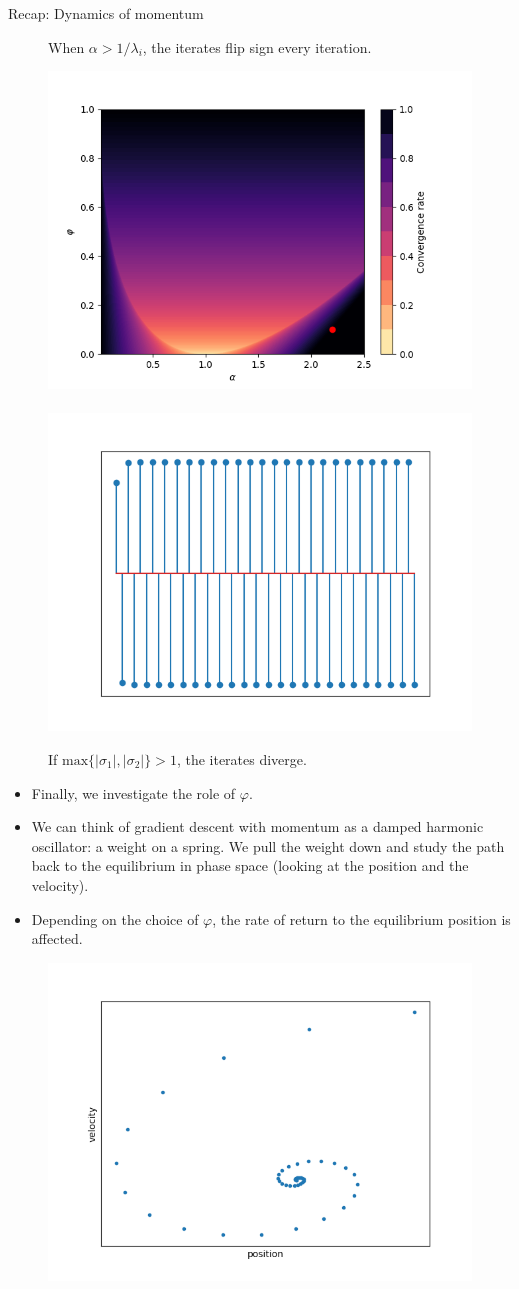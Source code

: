 \documentclass[11pt,compress,t,notes=noshow, xcolor=table]{beamer}
\begin{document}
\begin{vbframe}{Recap: Dynamics of momentum}
\begin{figure}
	\begin{footnotesize} 
		When $\alpha > 1/\lambda_i$, the iterates flip sign every iteration. 
	\end{footnotesize}
\end{figure}
\framebreak
\vspace*{1.0cm}
\begin{figure}
	\includegraphics[height=0.35\textwidth, keepaspectratio]{figure_man/momentum_conv_div.png} ~~ \includegraphics[height=0.35\textwidth, keepaspectratio]{figure_man/momentum_div.png} \\
	\begin{footnotesize} 
		If  $\text{max} \{|\sigma_1|, |\sigma_2| \} > 1$, the iterates diverge. 
	\end{footnotesize}
\end{figure}

\framebreak
\begin{itemize}
	\item Finally, we investigate the role of $\varphi$. 
	\item We can think of gradient descent with momentum as a damped harmonic oscillator: a weight on a spring. We pull the weight down and study the path back to the equilibrium in phase space (looking at the position and the velocity). 
	\item Depending on the choice of $\varphi$, the rate of return to the equilibrium position is affected. 
\end{itemize}

\begin{figure}
	\includegraphics[height=0.35\textwidth, keepaspectratio]{figure_man/phasespace_underdamping.png} 
\end{figure}


\end{vbframe}
\end{document}
